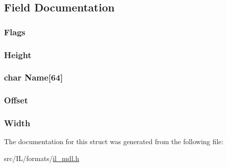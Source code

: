 \subsection{Field Documentation}
\hypertarget{struct_t_e_x___h_e_a_d_ad5c4db01d6ffdff05862b7052afa79fc}{
\subsubsection[{Flags}]{ Flags}}\label{struct_t_e_x___h_e_a_d_ad5c4db01d6ffdff05862b7052afa79fc}
\hypertarget{struct_t_e_x___h_e_a_d_a8a8093d76b61a95fc96df24af29b107a}{
\subsubsection[{Height}]{ Height}}\label{struct_t_e_x___h_e_a_d_a8a8093d76b61a95fc96df24af29b107a}
\hypertarget{struct_t_e_x___h_e_a_d_aa89339d079ce1d91fdfa754d0969a8a5}{
\subsubsection[{Name}]{\setlength{\rightskip}{0pt plus 5cm}char Name\mbox{[}64\mbox{]}}}\label{struct_t_e_x___h_e_a_d_aa89339d079ce1d91fdfa754d0969a8a5}
\hypertarget{struct_t_e_x___h_e_a_d_a3b5617e246c8182c704c5369dec7f049}{
\subsubsection[{Offset}]{ Offset}}\label{struct_t_e_x___h_e_a_d_a3b5617e246c8182c704c5369dec7f049}
\hypertarget{struct_t_e_x___h_e_a_d_a4146e7b2b0b4097e0e335f9b348392bf}{
\subsubsection[{Width}]{ Width}}\label{struct_t_e_x___h_e_a_d_a4146e7b2b0b4097e0e335f9b348392bf}


The documentation for this struct was generated from the following file\-:\begin{DoxyCompactItemize}
\item 
src/\-I\-L/formats/\hyperlink{il__mdl_8h}{il\-\_\-mdl.\-h}\end{DoxyCompactItemize}
